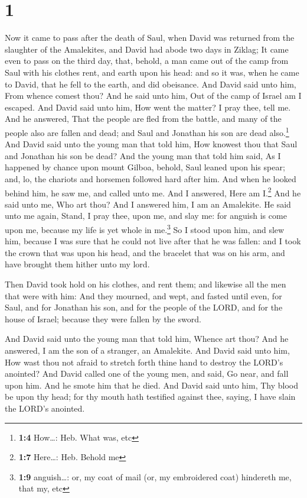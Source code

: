 \hypertarget{section}{%
\section{1}\label{section}}

 Now it came to pass after the death of Saul, when David
was returned from the slaughter of the Amalekites, and David had abode
two days in Ziklag;  It came even to pass on the third
day, that, behold, a man came out of the camp from Saul with his clothes
rent, and earth upon his head: and so it was, when he came to David,
that he fell to the earth, and did obeisance.  And David
said unto him, From whence comest thou? And he said unto him, Out of the
camp of Israel am I escaped.  And David said unto him, How
went the matter? I pray thee, tell me. And he answered, That the people
are fled from the battle, and many of the people also are fallen and
dead; and Saul and Jonathan his son are dead also.\footnote{\textbf{1:4}
  How\ldots: Heb. What was, etc}  And David said unto the
young man that told him, How knowest thou that Saul and Jonathan his son
be dead?  And the young man that told him said, As I
happened by chance upon mount Gilboa, behold, Saul leaned upon his
spear; and, lo, the chariots and horsemen followed hard after him.
 And when he looked behind him, he saw me, and called unto
me. And I answered, Here am I.\footnote{\textbf{1:7} Here\ldots: Heb.
  Behold me}  And he said unto me, Who art thou? And I
answered him, I am an Amalekite.  He said unto me again,
Stand, I pray thee, upon me, and slay me: for anguish is come upon me,
because my life is yet whole in me.\footnote{\textbf{1:9} anguish\ldots:
  or, my coat of mail (or, my embroidered coat) hindereth me, that my,
  etc}  So I stood upon him, and slew him, because I was
sure that he could not live after that he was fallen: and I took the
crown that was upon his head, and the bracelet that was on his arm, and
have brought them hither unto my lord.

 Then David took hold on his clothes, and rent them; and
likewise all the men that were with him:  And they
mourned, and wept, and fasted until even, for Saul, and for Jonathan his
son, and for the people of the LORD, and for the house of Israel;
because they were fallen by the sword.

 And David said unto the young man that told him, Whence
art thou? And he answered, I am the son of a stranger, an Amalekite.
 And David said unto him, How wast thou not afraid to
stretch forth thine hand to destroy the LORD's anointed? 
And David called one of the young men, and said, Go near, and fall upon
him. And he smote him that he died.  And David said unto
him, Thy blood be upon thy head; for thy mouth hath testified against
thee, saying, I have slain the LORD's anointed.

